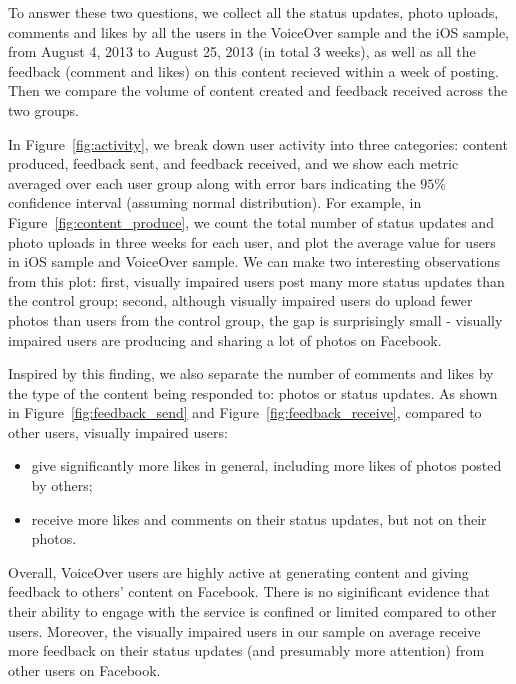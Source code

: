 \documentclass{sigchi}
\begin{document}
To answer these two questions, we collect all the status updates, photo uploads, comments and likes by all the users in the VoiceOver sample and the iOS sample, from August 4, 2013 to August 25, 2013 (in total 3 weeks), as well as all the feedback (comment and likes) on this content recieved within a week of posting.  Then we compare the volume of content created and feedback received across the two groups. 

 
In Figure~\ref{fig:activity}, we break down user activity into three categories: content produced, feedback sent, and feedback received, and we show each metric averaged over each user group along with error bars indicating the $95\%$ confidence interval (assuming normal distribution). For example, in Figure~\ref{fig:content_produce}, we count the total number of status updates and photo uploads in three weeks for each user, and plot the average value for users in iOS sample and VoiceOver sample. We can make two interesting observations from this plot: first, visually impaired users post many more status updates than the control group; second, although visually impaired users do upload fewer photos than users from the control group, the gap is surprisingly small - visually impaired users are producing and sharing a lot of photos on Facebook. 

Inspired by this finding, we also separate the number of comments and likes by the type of the content being responded to: photos or status updates. As shown in Figure~\ref{fig:feedback_send} and Figure~\ref{fig:feedback_receive}, compared to other users, visually impaired users:
\begin{itemize}
\item give significantly more likes in general, including more likes of photos posted by others;
\item receive more likes and comments on their status updates, but not on their photos.
\end{itemize}

Overall, VoiceOver users are highly active at generating content and giving feedback to others' content on Facebook. There is no siginificant evidence that their ability to engage with the service is confined or limited compared to other users. Moreover, the visually impaired users in our sample on average receive more feedback on their status updates (and presumably more attention) from other users on Facebook. 
\end{document}
